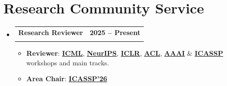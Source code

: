 \documentclass[letterpaper,11pt]{article}
\makeatletter
\newcommand{\resumeItem}[1]{
  \item\small{
    {#1 \vspace{-2pt}}
  }
}
\newcommand{\resumeSubheading}[4]{
  \vspace{-2pt}\item
    \begin{tabular*}{1.0\textwidth}[t]{l@{\extracolsep{\fill}}r}
      \textbf{#1} & \textbf{\small #2} \\
      \text{\small#3} & \text{\small #4} \\
    \end{tabular*}\vspace{-7pt}
}
\newcommand{\resumeSubHeadingListStart}{\begin{itemize}[leftmargin=0.0in, label={}]}
\newcommand{\resumeSubHeadingListEnd}{\end{itemize}}
\newcommand{\resumeItemListStart}{\begin{itemize}}
\newcommand{\resumeItemListEnd}{\end{itemize}\vspace{-5pt}}
\makeatother
\begin{document}
\section{Research Community Service}

\resumeSubHeadingListStart
\resumeSubheading
  {Research Reviewer}{2025 -- Present}
  {}{}
  \resumeItemListStart
    \resumeItem{\textbf{Reviewer}:  
    \href{https://icml.cc/}{\color{Blue}\textbf{ICML}}, 
    \href{https://neurips.cc/}{\color{Blue}\textbf{NeurIPS}},
    \href{https://iclr.cc/}{\color{Blue}\textbf{ICLR}},
    \href{https://www.aclweb.org/portal/}{\color{Blue}\textbf{ACL}},
    \href{https://aaai.org/conference/aaai/}{\color{Blue}\textbf{AAAI}} \&
    \href{https://2026.ieeeicassp.org/}{\color{Blue}\textbf{ICASSP}}
    workshops and main tracks.}
    \resumeItem{\textbf{Area Chair}: \href{https://2026.ieeeicassp.org/}{\color{Blue}\textbf{ICASSP'26}}}
  \resumeItemListEnd
  \resumeSubHeadingListEnd


\end{document}
